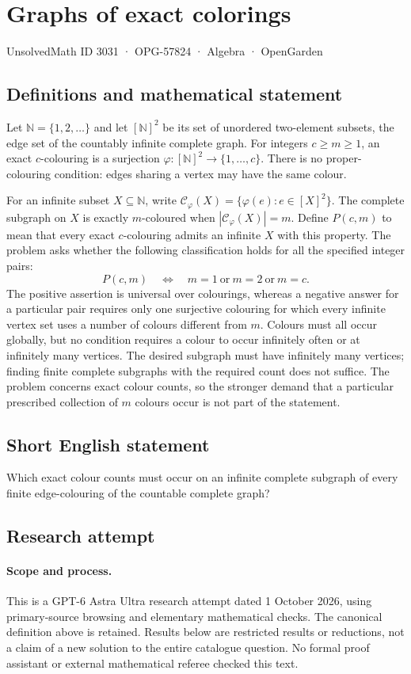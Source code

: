 \documentclass[11pt,a4paper]{article}
\begin{document}
\section*{Graphs of exact colorings}\label{3031}
{\small UnsolvedMath ID 3031 · OPG-57824 · Algebra · OpenGarden}
\subsection{Definitions and mathematical statement}
Let $\mathbb N=\{1,2,\ldots\}$ and let $[\mathbb N]^2$ be its set of unordered
two-element subsets, the edge set of the countably infinite complete graph.
For integers $c\ge m\ge1$, an exact $c$-colouring is a surjection
$\varphi:[\mathbb N]^2\to\{1,\ldots,c\}$. There is no proper-colouring
condition: edges sharing a vertex may have the same colour.

For an infinite subset $X\subseteq\mathbb N$, write
$\mathcal C_\varphi(X)=\{\varphi(e):e\in[X]^2\}$.
The complete subgraph on $X$ is exactly $m$-coloured when
$|\mathcal C_\varphi(X)|=m$. Define $P(c,m)$ to mean that every exact
$c$-colouring admits an infinite $X$ with this property.
The problem asks whether the following classification holds for all the
specified integer pairs:
\[
 P(c,m)\quad\Longleftrightarrow\quad
 m=1\ \text{or}\ m=2\ \text{or}\ m=c.
\]
The positive assertion is universal over colourings, whereas a negative
answer for a particular pair requires only one surjective colouring for
which every infinite vertex set uses a number of colours different from $m$.
Colours must all occur globally, but no condition requires a colour to occur
infinitely often or at infinitely many vertices. The desired subgraph must
have infinitely many vertices; finding finite complete subgraphs with the
required count does not suffice. The problem concerns exact colour counts,
so the stronger demand that a particular prescribed collection of $m$
colours occur is not part of the statement.
\subsection{Short English statement}
Which exact colour counts must occur on an infinite complete subgraph of every finite edge-colouring of the countable complete graph?
\subsection{Research attempt}
\paragraph{Scope and process.}
This is a GPT-6 Astra Ultra research attempt dated 1 October 2026, using
primary-source browsing and elementary mathematical checks. The canonical
definition above is retained. Results below are restricted results or
reductions, not a claim of a new solution to the entire catalogue question.
No formal proof assistant or external mathematical referee checked this text.
\end{document}
